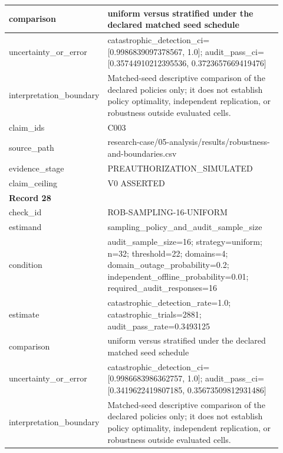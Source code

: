 \begin{longtable}{|p{0.24\linewidth}|p{0.68\linewidth}|}
comparison & uniform versus stratified under the declared matched seed schedule \\ \hline
uncertainty\_\allowbreak{}or\_\allowbreak{}error & catastrophic\_\allowbreak{}detection\_\allowbreak{}ci=[0.9986839097378567, 1.0];\allowbreak{} audit\_\allowbreak{}pass\_\allowbreak{}ci=[0.35744910212395536, 0.3723657669419476] \\ \hline
interpretation\_\allowbreak{}boundary & Matched-seed descriptive comparison of the declared policies only;\allowbreak{} it does not establish policy optimality, independent replication, or robustness outside evaluated cells. \\ \hline
claim\_\allowbreak{}ids & C003 \\ \hline
source\_\allowbreak{}path & research-case/05-analysis/results/robustness-and-boundaries.csv \\ \hline
evidence\_\allowbreak{}stage & PREAUTHORIZATION\_\allowbreak{}SIMULATED \\ \hline
claim\_\allowbreak{}ceiling & V0 ASSERTED \\ \hline
\multicolumn{2}{|l|}{\textbf{Record 28}} \\ \hline
check\_\allowbreak{}id & ROB-SAMPLING-16-UNIFORM \\ \hline
estimand & sampling\_\allowbreak{}policy\_\allowbreak{}and\_\allowbreak{}audit\_\allowbreak{}sample\_\allowbreak{}size \\ \hline
condition & audit\_\allowbreak{}sample\_\allowbreak{}size=16;\allowbreak{} strategy=uniform;\allowbreak{} n=32;\allowbreak{} threshold=22;\allowbreak{} domains=4;\allowbreak{} domain\_\allowbreak{}outage\_\allowbreak{}probability=0.2;\allowbreak{} independent\_\allowbreak{}offline\_\allowbreak{}probability=0.01;\allowbreak{} required\_\allowbreak{}audit\_\allowbreak{}responses=16 \\ \hline
estimate & catastrophic\_\allowbreak{}detection\_\allowbreak{}rate=1.0;\allowbreak{} catastrophic\_\allowbreak{}trials=2881;\allowbreak{} audit\_\allowbreak{}pass\_\allowbreak{}rate=0.3493125 \\ \hline
comparison & uniform versus stratified under the declared matched seed schedule \\ \hline
uncertainty\_\allowbreak{}or\_\allowbreak{}error & catastrophic\_\allowbreak{}detection\_\allowbreak{}ci=[0.9986683986362757, 1.0];\allowbreak{} audit\_\allowbreak{}pass\_\allowbreak{}ci=[0.3419622419807185, 0.35673509812931486] \\ \hline
interpretation\_\allowbreak{}boundary & Matched-seed descriptive comparison of the declared policies only;\allowbreak{} it does not establish policy optimality, independent replication, or robustness outside evaluated cells. \\ \hline

\end{longtable}
